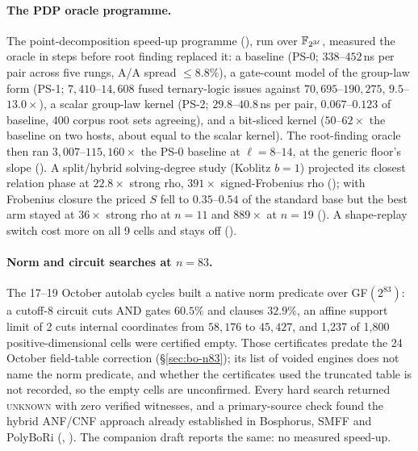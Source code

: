\paragraph{The PDP oracle programme.} The point-decomposition speed-up
programme (), run over
$\mathbb{F}_{2^{3\ell}}$, measured the oracle in steps before root finding replaced
it: a baseline (PS-0; $338$--$452$\,ns per pair across five rungs, A/A
spread $\le8.8\%$), a gate-count model of the group-law form (PS-1;
$7{,}410$--$14{,}608$ fused ternary-logic issues against
$70{,}695$--$190{,}275$, $9.5$--$13.0\times$), a scalar group-law kernel (PS-2;
$29.8$--$40.8$\,ns per pair, $0.067$--$0.123$ of baseline, 400 corpus root
sets agreeing), and a bit-sliced kernel ($50$--$62\times$ the baseline on two
hosts, about equal to the scalar kernel). The root-finding oracle then ran
$3{,}007$--$115{,}160\times$ the PS-0 baseline at $\ell=8$--$14$, at the generic
floor's slope (). A split/hybrid
solving-degree study (Koblitz $b=1$) projected its closest relation phase at
$22.8\times$ strong rho, $391\times$ signed-Frobenius rho
(); with Frobenius closure the priced
$S$ fell to $0.35$--$0.54$ of the standard base but the best arm stayed at
$36\times$ strong rho at $n=11$ and $889\times$ at $n=19$
(). A shape-replay switch cost more
on all 9 cells and stays off ().

\paragraph{Norm and circuit searches at $n=83$.} The 17--19 October
autolab cycles built a native norm predicate over GF$(2^{83})$: a cutoff-8
circuit cuts AND gates $60.5\%$ and clauses $32.9\%$, an affine support limit
of 2 cuts internal coordinates from $58{,}176$ to $45{,}427$, and 1{,}237 of
1{,}800 positive-dimensional cells were certified empty. Those certificates
predate the 24 October field-table correction (\S\ref{sec:bo-n83}); its list
of voided engines does not name the norm predicate, and whether the
certificates used the truncated table is not recorded, so the empty cells
are unconfirmed. Every hard search
returned \textsc{unknown} with zero verified witnesses, and a primary-source
check found the hybrid ANF/CNF approach already established in Bosphorus,
SMFF and PolyBoRi (,
). The companion draft
 reports the same: no measured speed-up.

